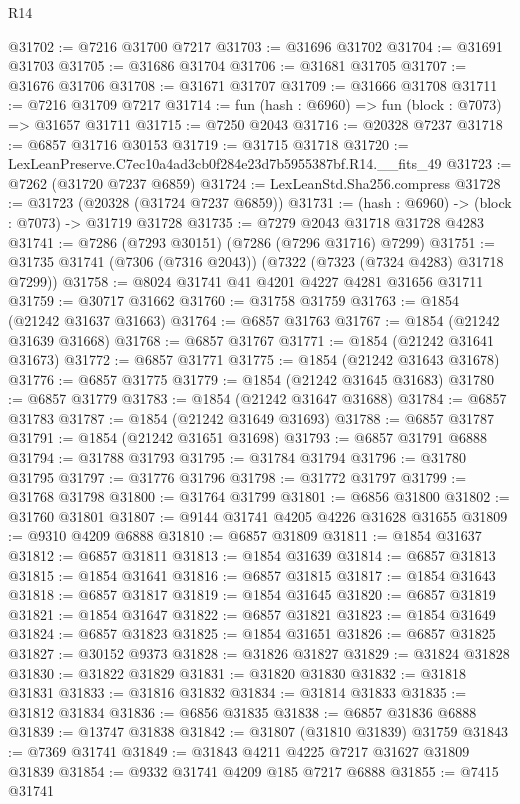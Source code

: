 \begin{lexlean}{R14}
\begin{coremodule}
@31702 := @7216 @31700 @7217
@31703 := @31696 @31702
@31704 := @31691 @31703
@31705 := @31686 @31704
@31706 := @31681 @31705
@31707 := @31676 @31706
@31708 := @31671 @31707
@31709 := @31666 @31708
@31711 := @7216 @31709 @7217
@31714 := fun (hash : @6960) => fun (block : @7073) => @31657 @31711
@31715 := @7250 @2043
@31716 := @20328 @7237
@31718 := @6857 @31716 @30153
@31719 := @31715 @31718
@31720 := LexLeanPreserve.C7ec10a4ad3cb0f284e23d7b5955387bf.R14.__fits_49
@31723 := @7262 (@31720 @7237 @6859)
@31724 := LexLeanStd.Sha256.compress
@31728 := @31723 (@20328 (@31724 @7237 @6859))
@31731 := (hash : @6960) -> (block : @7073) -> @31719 @31728
@31735 := @7279 @2043 @31718 @31728 @4283
@31741 := @7286 (@7293 @30151) (@7286 (@7296 @31716) @7299)
@31751 := @31735 @31741 (@7306 (@7316 @2043)) (@7322 (@7323 (@7324 @4283) @31718 @7299))
@31758 := @8024 @31741 @41 @4201 @4227 @4281 @31656 @31711
@31759 := @30717 @31662
@31760 := @31758 @31759
@31763 := @1854 (@21242 @31637 @31663)
@31764 := @6857 @31763
@31767 := @1854 (@21242 @31639 @31668)
@31768 := @6857 @31767
@31771 := @1854 (@21242 @31641 @31673)
@31772 := @6857 @31771
@31775 := @1854 (@21242 @31643 @31678)
@31776 := @6857 @31775
@31779 := @1854 (@21242 @31645 @31683)
@31780 := @6857 @31779
@31783 := @1854 (@21242 @31647 @31688)
@31784 := @6857 @31783
@31787 := @1854 (@21242 @31649 @31693)
@31788 := @6857 @31787
@31791 := @1854 (@21242 @31651 @31698)
@31793 := @6857 @31791 @6888
@31794 := @31788 @31793
@31795 := @31784 @31794
@31796 := @31780 @31795
@31797 := @31776 @31796
@31798 := @31772 @31797
@31799 := @31768 @31798
@31800 := @31764 @31799
@31801 := @6856 @31800
@31802 := @31760 @31801
@31807 := @9144 @31741 @4205 @4226 @31628 @31655
@31809 := @9310 @4209 @6888
@31810 := @6857 @31809
@31811 := @1854 @31637
@31812 := @6857 @31811
@31813 := @1854 @31639
@31814 := @6857 @31813
@31815 := @1854 @31641
@31816 := @6857 @31815
@31817 := @1854 @31643
@31818 := @6857 @31817
@31819 := @1854 @31645
@31820 := @6857 @31819
@31821 := @1854 @31647
@31822 := @6857 @31821
@31823 := @1854 @31649
@31824 := @6857 @31823
@31825 := @1854 @31651
@31826 := @6857 @31825
@31827 := @30152 @9373
@31828 := @31826 @31827
@31829 := @31824 @31828
@31830 := @31822 @31829
@31831 := @31820 @31830
@31832 := @31818 @31831
@31833 := @31816 @31832
@31834 := @31814 @31833
@31835 := @31812 @31834
@31836 := @6856 @31835
@31838 := @6857 @31836 @6888
@31839 := @13747 @31838
@31842 := @31807 (@31810 @31839) @31759
@31843 := @7369 @31741
@31849 := @31843 @4211 @4225 @7217 @31627 @31809 @31839
@31854 := @9332 @31741 @4209 @185 @7217 @6888
@31855 := @7415 @31741

\end{coremodule}
\end{lexlean}
